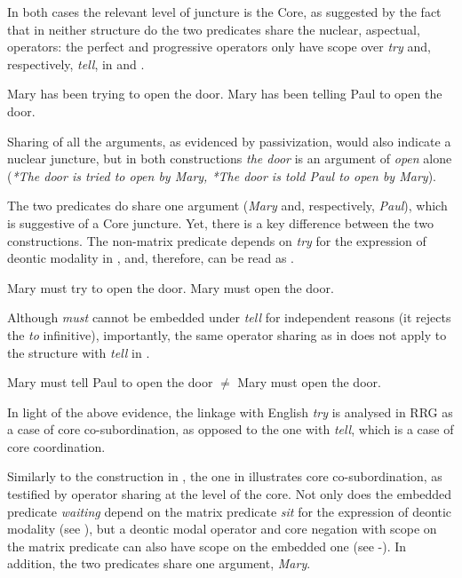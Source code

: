 \documentclass[output=paper,hidelinks]{langscibook}
\begin{document}
In both cases the relevant level of juncture is the Core, as suggested by the fact that in neither structure do the two predicates share the nuclear, aspectual, operators: the perfect and progressive operators only have scope over \textit{try} and, respectively, \textit{tell}, in  and .

\ea%
   \label{ex:RRG:36}
\ea\label{ex:RRG:36a} Mary has been trying to open the door.
\ex\label{ex:RRG:36b} Mary has been telling Paul to open the door.
\z\z

Sharing of all the arguments, as evidenced by passivization, would also indicate a nuclear juncture, but in both constructions \textit{the door} is an argument of \textit{open} alone (\textit{*The door is tried to open by Mary, *The door is told Paul to open by Mary}).

  The two predicates do share one argument (\emph{Mary} and, respectively, \emph{Paul}), which is suggestive of a Core juncture. Yet, there is a key difference between the two constructions. The non-matrix predicate depends on \textit{try} for the expression of deontic modality in , and, therefore,  can be read as .

\ea%
   \label{ex:RRG:37}
\ea\label{ex:RRG:37a} Mary must try to open the door.
\ex\label{ex:RRG:37b} Mary must open the door.
\z\z

Although \textit{must} cannot be embedded under \textit{tell} for independent reasons (it rejects the \textit{to} infinitive), importantly, the same operator sharing as in  does not apply to the structure with \textit{tell} in .

\ea%
   \label{ex:RRG:38}
Mary must tell Paul to open the door ${\neq}$ Mary must open the door.
\z

\noindent In light of the above evidence, the linkage with English \textit{try} is analysed in RRG as a case of core co-subordination, as opposed to the one with \textit{tell}, which is a case of core coordination.

  Similarly to the construction in , the one in  illustrates core co-subor\-di\-nation, as testified by operator sharing at the level of the core. Not only does the embedded predicate \textit{waiting} depend on the matrix predicate \textit{sit} for the expression of deontic modality (see ), but a deontic modal operator and core negation with scope on the matrix predicate can also have scope on the embedded one (see -). In addition, the two predicates share one argument, \textit{Mary}.
\end{document}

